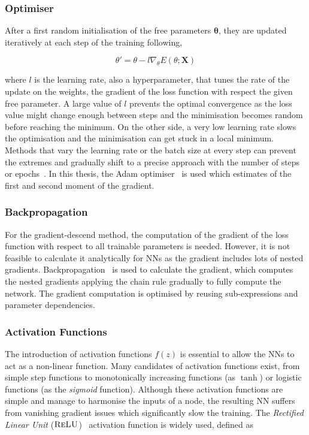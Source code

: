 \subsubsection{Optimiser}

After a first random initialisation of the free parameters $\boldsymbol{\theta}$, they are updated iteratively at each step of the training following,

\begin{equation}
    \theta' = \theta - l \nabla_\theta E(\theta;\mathbf{X})
\end{equation}

where $l$ is the learning rate, also a hyperparameter, that tunes the rate of the update on the weights, the gradient of the loss function with respect the given free parameter. A large value of $l$ prevents the optimal convergence as the loss value might change enough between steps and the minimisation becomes random before reaching the minimum. On the other side, a very low learning rate slows the optimisation and the minimisation can get stuck in a local minimum. Methods that vary the learning rate or the batch size at every step can prevent the extremes and gradually shift to a precise approach with the number of steps or epochs~\cite{LRBatchSize}. In this thesis, the Adam optimiser~\cite{Kingma2015AdamAM} is used which estimates of the first and second moment of the gradient.

\subsubsection{Backpropagation}

For the gradient-descend method, the computation of the gradient of the loss function with respect to all trainable parameters is needed. However, it is not feasible to calculate it analytically for NNs as the gradient includes lots of nested gradients. Backpropagation~\cite{Rumelhart1986} is used to calculate the gradient, which computes the nested gradients applying the chain rule gradually to fully compute the network. The gradient computation is optimised by reusing sub-expressions and parameter dependencies.

\subsubsection{Activation Functions}

The introduction of activation functions $f(z)$ is essential to allow the NNs to act as a non-linear function. Many candidates of activation functions exist, from simple step functions to monotonically increasing functions (as $\tanh$) or logistic functions (as the \textit{sigmoid} function). Although these activation functions are simple and manage to harmonise the inputs of a node, the resulting NN suffers from vanishing gradient issues which significantly slow the training. The \textit{Rectified Linear Unit} ($\textsc{ReLU}$)~\cite{relu} activation function is widely used, defined as


